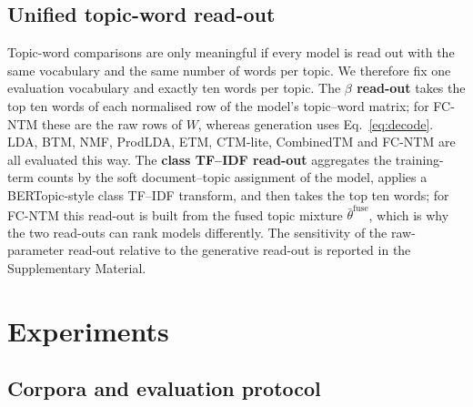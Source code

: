 \documentclass[Journal,letterpaper]{ascelike-new}
\newcommand{\fcntm}{FC-NTM}
\begin{document}
\subsection{Unified topic-word read-out}
\label{sec:readout}

Topic-word comparisons are only meaningful if every model is read out with the same vocabulary and
the same number of words per topic. We therefore fix one evaluation vocabulary and exactly ten
words per topic. The \textbf{$\beta$ read-out} takes the top ten words of each normalised row of
the model's topic--word matrix; for \fcntm{} these are the raw rows of $W$, whereas generation
uses Eq.~\eqref{eq:decode}. LDA, BTM, NMF, ProdLDA, ETM, CTM-lite, CombinedTM and \fcntm{} are all
evaluated this way. The \textbf{class TF--IDF read-out} aggregates the training-term counts by the
soft document--topic assignment of the model, applies a BERTopic-style class TF--IDF transform,
and then takes the top ten words; for \fcntm{} this read-out is built from the fused topic mixture
$\bar\theta^{\mathrm{fuse}}$, which is why the two read-outs can rank models differently. The
sensitivity of the raw-parameter read-out relative to the generative read-out is reported in the
Supplementary Material.

\section{Experiments}

\subsection{Corpora and evaluation protocol}
\end{document}
